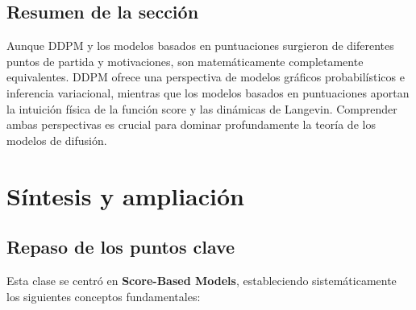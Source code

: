 \documentclass[a4paper]{article}
\begin{document}
\subsection{Resumen de la sección}

Aunque DDPM y los modelos basados en puntuaciones surgieron de diferentes puntos de partida y motivaciones, son matemáticamente completamente equivalentes. DDPM ofrece una perspectiva de modelos gráficos probabilísticos e inferencia variacional, mientras que los modelos basados en puntuaciones aportan la intuición física de la función score y las dinámicas de Langevin. Comprender ambas perspectivas es crucial para dominar profundamente la teoría de los modelos de difusión.


\section{Síntesis y ampliación}

\subsection{Repaso de los puntos clave}

Esta clase se centró en \textbf{Score-Based Models}, estableciendo sistemáticamente los siguientes conceptos fundamentales:
\end{document}
